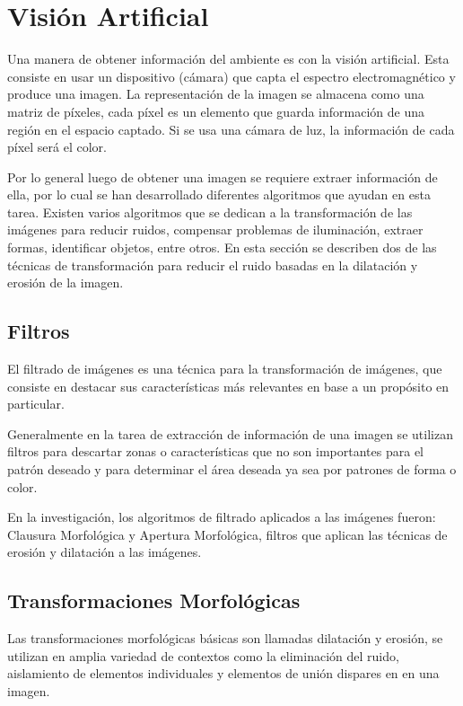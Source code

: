 \section{Visión Artificial} \label{sect:Vision_Artificial}

Una manera de obtener información del ambiente es con la visión artificial. Esta consiste en usar un dispositivo (cámara) que
capta el espectro electromagnético y produce una imagen. La representación de la imagen se almacena como una matriz de píxeles,
cada píxel es un elemento que guarda información de una región en el espacio captado. Si se usa una cámara de luz, la información
de cada píxel será el color. \cite{AiRobotics}  

Por lo general luego de obtener una imagen se requiere extraer información de ella, por lo cual se han desarrollado diferentes
algoritmos que ayudan en esta tarea. Existen varios algoritmos que se dedican a la transformación de las imágenes para reducir
ruidos, compensar problemas de iluminación, extraer formas, identificar objetos, entre otros. En esta sección se describen dos
de las técnicas de transformación para reducir el ruido basadas en la dilatación y erosión de la imagen. 

\subsection{Filtros }
El filtrado de imágenes es una técnica para la transformación de imágenes, que consiste en destacar  sus características más relevantes en base a un propósito en particular. 

Generalmente en la tarea de extracción de información de una imagen se utilizan filtros para descartar zonas o características que no son importantes para el patrón deseado y para determinar el área deseada ya sea por patrones de forma o color.

En la investigación, los algoritmos de filtrado aplicados a las imágenes fueron: Clausura Morfológica y Apertura Morfológica, filtros que aplican las técnicas de erosión y dilatación a las imágenes.

\subsection{Transformaciones Morfológicas}
Las transformaciones morfológicas básicas son llamadas dilatación y erosión, se utilizan en 
amplia variedad de contextos como la eliminación del ruido, aislamiento de elementos individuales y elementos de unión dispares
en en una imagen.\cite{BookOpenCv}

